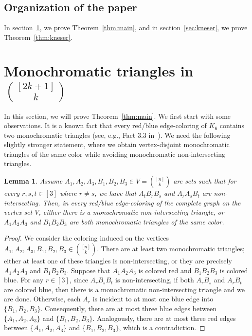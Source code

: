 \documentclass[11pt]{amsart}
\newtheorem{lemma}[theorem]{Lemma}
\begin{document}
\subsection*{Organization of the paper} In section~\ref{sec:main}, we prove Theorem~\ref{thm:main}, and in section~\ref{sec:kneser}, we prove Theorem~\ref{thm:kneser}.

\section{Monochromatic triangles in $\binom{[2k+1]}{k}$} \label{sec:main}

In this section, we will prove Theorem~\ref{thm:main}. We first start with some observations. It is a known fact that every red/blue edge-coloring of $K_6$ contains two monochromatic triangles (see, e.g., Fact 3.3 in~\cite{balogh}). We need the following slightly stronger statement, where we obtain vertex-disjoint monochromatic triangles of the same color while avoiding monochromatic non-intersecting triangles.

\begin{lemma}\label{lem:6sets}
    Assume $A_1,A_2,A_3, B_1, B_2, B_3 \in V = \binom{[n]}{k}$ are sets such that for every $r,s,t \in [3]$ where $r\neq s$, we have that $A_tB_rB_s$ and $A_r A_s  B_t $ are non-intersecting. Then, in every red/blue edge-coloring of the complete graph on the vertex set $V$, either there is a monochromatic non-intersecting triangle, or $A_1A_2A_3$ and $B_1B_2B_3$ are both monochromatic triangles of the same color.
\end{lemma}
    
\begin{proof}
    We consider the coloring induced on the vertices $A_1,A_2,A_3, B_1, B_2, B_3 \in \binom{[n]}{k}$. There are at least two monochromatic triangles; either at least one of these triangles is non-intersecting, or they are precisely $A_1A_2A_3$ and $B_1B_2B_3$. Suppose that $A_1A_2A_3$ is colored red and $B_1B_2B_3$ is colored blue.
    For any $r\in [3]$, since $A_r B_s B_t$ is non-intersecting, if both $A_rB_s$ and $A_rB_t$ are colored blue, then there is a monochromatic non-intersecting triangle and we are done. Otherwise, each $A_r$ is incident to at most one blue edge into $\{B_1, B_2, B_3\}$. Consequently, there are at most three blue edges between $\{A_1, A_2, A_3\}$ and $\{B_1, B_2, B_3\}$. Analogously, there are at most three red edges between $\{A_1, A_2, A_3\}$ and $\{B_1, B_2, B_3\}$, which is a contradiction.
\end{proof}
\end{document}

